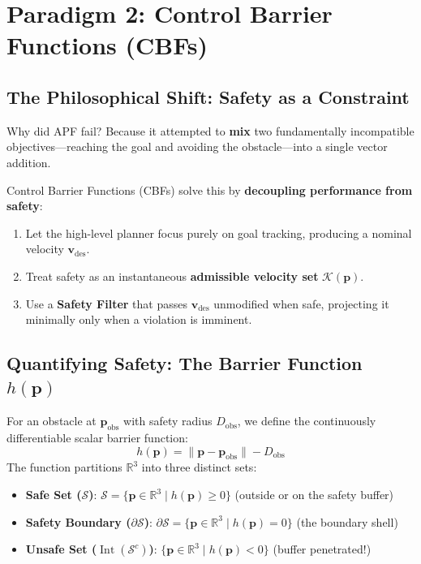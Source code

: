 \documentclass[11pt,a4paper]{article}
\begin{document}
\section{Paradigm 2: Control Barrier Functions (CBFs)}

\subsection{The Philosophical Shift: Safety as a Constraint}
Why did APF fail? Because it attempted to \textbf{mix} two fundamentally incompatible objectives—reaching the goal and avoiding the obstacle—into a single vector addition. 

Control Barrier Functions (CBFs) \cite{ames2014control, ames2017control, ames2020control} solve this by \textbf{decoupling performance from safety}:
\begin{enumerate}
    \item Let the high-level planner focus purely on goal tracking, producing a nominal velocity $\mathbf{v}_{\mathrm{des}}$.
    \item Treat safety as an instantaneous \textbf{admissible velocity set} $\mathcal{K}(\mathbf{p})$.
    \item Use a \textbf{Safety Filter} that passes $\mathbf{v}_{\mathrm{des}}$ unmodified when safe, projecting it minimally only when a violation is imminent.
\end{enumerate}

\subsection{Quantifying Safety: The Barrier Function \texorpdfstring{$h(\mathbf{p})$}{h(p)}}
\begin{definitionbox}
For an obstacle at $\mathbf{p}_{\mathrm{obs}}$ with safety radius $D_{\mathrm{obs}}$, we define the continuously differentiable scalar barrier function:
\begin{equation}
h(\mathbf{p}) = \|\mathbf{p} - \mathbf{p}_{\mathrm{obs}}\| - D_{\mathrm{obs}}
\end{equation}
The function partitions $\mathbb{R}^3$ into three distinct sets:
\begin{itemize}
    \item \textbf{Safe Set ($\mathcal{S}$)}: $\mathcal{S} = \{\mathbf{p} \in \mathbb{R}^3 \mid h(\mathbf{p}) \ge 0\}$ (outside or on the safety buffer)
    \item \textbf{Safety Boundary ($\partial \mathcal{S}$)}: $\partial\mathcal{S} = \{\mathbf{p} \in \mathbb{R}^3 \mid h(\mathbf{p}) = 0\}$ (the boundary shell)
    \item \textbf{Unsafe Set ($\operatorname{Int}(\mathcal{S}^c)$)}: $\{\mathbf{p} \in \mathbb{R}^3 \mid h(\mathbf{p}) < 0\}$ (buffer penetrated!)
\end{itemize}
\end{definitionbox}
\end{document}
